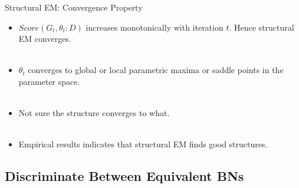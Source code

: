 \documentclass[hyperref={pdfpagelabels=false}]{beamer}
\begin{document}
\begin{frame}{Structural EM: Convergence Property}
	\begin{itemize}
		\item $Score(G_t,\theta_t:D)$ increases monotonically with iteration $t$. Hence structural EM converges.\\~\\
		\item $\theta_t$ converges to global or local parametric maxima or saddle points in the parameter space.\\~\\
		\item Not sure the structure converges to what.\\~\\
		\item Empirical results indicates that structural EM finds good structures.
	\end{itemize}
\end{frame}

\subsection{Discriminate Between Equivalent BNs}
	
\end{document}
